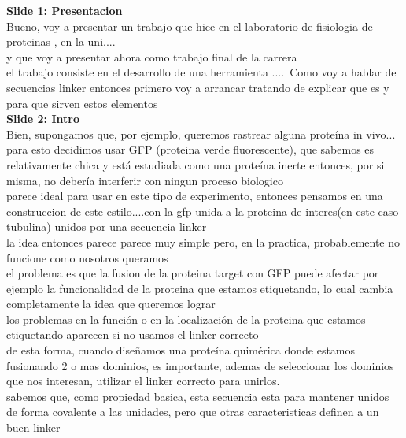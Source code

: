 \documentclass[a4paper,10pt]{article}
\begin{document}

\textbf{Slide 1: Presentacion}\\
Bueno, voy a presentar un trabajo que hice en el laboratorio de fisiologia de proteinas , en la uni....\\
y que voy a presentar ahora como trabajo final de la carrera\\
el trabajo consiste en el desarrollo de una herramienta ....\
Como voy a hablar de secuencias linker entonces primero voy a arrancar tratando de explicar que es y para que sirven estos elementos\\



\textbf{Slide 2: Intro}\\
Bien, supongamos que, por ejemplo, queremos rastrear alguna proteína in vivo...\\ 
para esto decidimos usar GFP (proteina verde fluorescente), que sabemos es relativamente chica y está estudiada como una proteína inerte entonces, por si misma, no debería interferir con ningun proceso biologico \\
parece ideal para usar en este tipo de experimento, entonces pensamos en una construccion de este estilo....con la gfp unida a la proteina de interes(en este caso tubulina) unidos por una secuencia linker \\
la idea entonces parece parece muy simple pero, en la practica, probablemente no funcione como nosotros queramos\\ 
el problema es que la fusion de la proteina target con GFP puede afectar por ejemplo la funcionalidad de la proteina que estamos etiquetando, lo cual cambia completamente la idea que queremos lograr\\
los problemas en la función o en la localización de la proteina que estamos etiquetando aparecen si no usamos el linker correcto\\ 
de esta forma, cuando diseñamos una proteína quimérica donde estamos fusionando 2 o mas dominios, es importante, ademas de seleccionar los dominios que nos interesan, utilizar el linker correcto para unirlos.\\
sabemos que, como propiedad basica, esta secuencia esta para mantener unidos de forma covalente a las unidades, pero que otras caracteristicas definen a un buen linker\\
\end{document}
